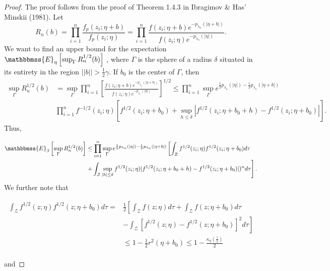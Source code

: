\documentclass[11pt]{statsoc}
\begin{document}
\begin{proof}
The proof follows from the proof of Theorem 1.4.3 in Ibragimov \& Has' Minskii (1981).  Let
\[
R_n(b) = \prod_{i=1}^n \frac{f_p(z_i;\eta+b)}{f_p(z_i;\eta)}=
\prod_{i=1}^n \frac{f(z_i;\eta+b)e^{- p_{\lambda_n}(|\eta+b|)}}{f(z_i;\eta)e^{- p_{\lambda_n}(|\eta|)}}.
\]
We want to find an upper bound for the expectation ${\mathbbmss{E}}_{\eta} \left[
\sup_{\Gamma} R_n^{1/2}(b) \right]$ , where $\Gamma$ is the sphere of a radius
$\delta$ situated in its entirety in the region $||b||>\frac{1}{2}\gamma$. If
$b_0$ is the center of $\Gamma$, then
\begin{align*}
\sup_{\Gamma}R_n^{1/2}(b) &= \sup_{\Gamma} \prod_{i=1}^n \left[\frac{f(z_i;\eta+b)e^{- p_{\lambda_n}(|\eta+b|)}}{f(z_i;\eta)e^{- p_{\lambda_n}(|\eta|)}} \right]^{1/2} \leq  \prod_{i=1}^n \sup_{\Gamma} e^{ \frac{1}{2}p_{\lambda_n}(|\eta|)-\frac{1}{2}p_{\lambda_n}(|\eta+b|)} \\
& \prod_{i=1}^n f^{-1/2}(z_i;\eta) \left[ f^{1/2}(z_i;\eta+b_0) +\sup_{h\leq \delta} |  f^{1/2}(z_i;\eta+b_0+h)-f^{1/2}(z_i;\eta+b_0)    |\right].
\end{align*}
Thus,

\begin{align*}
{\mathbbmss{E}}_{\beta} \left[\sup_{\Gamma}R_n^{1/2}(b)\right] &\leq \prod_{i=1}^n \sup_{\Gamma} e^{ \frac{1}{2}p_{\lambda_n}(|\eta|)-\frac{1}{2}p_{\lambda_n}(|\eta+b|)} \left[ \int_{\mathcal Z} f^{1/2}(z_i;\eta)f^{1/2}(z_i;\eta+b_0) d\tau \right. \\
& \left.+ \int_{\mathcal Z} \sup_{|h|\leq \delta} f^{1/2}(z_i;\eta)| f^{1/2}(z_i;\eta+b_0+h)-f^{1/2}(z_i;\eta+b_0)    | )^n d\tau \right].
\end{align*}
We further note that

\begin{align}
\label{eq:lemproof1}
\int_{\mathcal Z} f^{1/2}(z;\eta)f^{1/2}(z;\eta+b_0)d\tau = &\frac{1}{2}  \left[\int_{\mathcal Z}f(z;\eta)d\tau+\int_{\mathcal Z}f(z;\eta+b_0)d\tau \right.\\      \nonumber
&\left. -\int_{\mathcal Z}[f^{1/2}(z;\eta)-f^{1/2}(z;\eta+b_0)]^2d\tau  \right] \\  \nonumber
& \leq 1-\frac{1}{2}r^2(\eta+b_0) \leq 1 - \frac{\kappa_{\eta}(\frac{\gamma}{2})}{2}
\end{align} \vspace{-.7in} \\
and


\end{proof}
\end{document}
